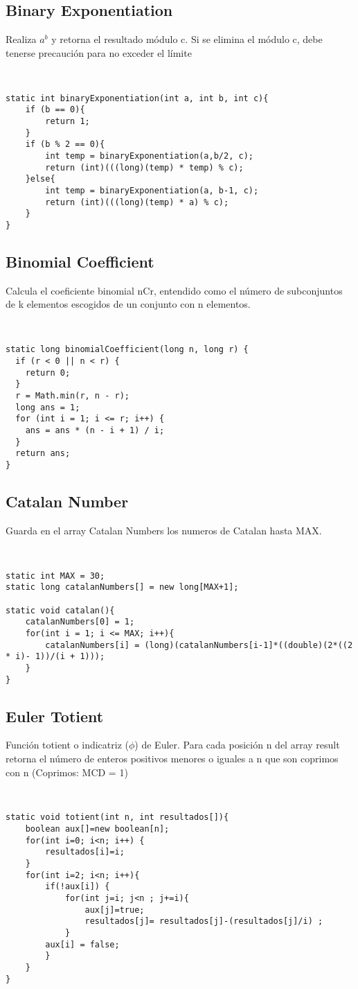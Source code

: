 \documentclass[11pt,letterpaper,twocolumn,twosided]{article}
\begin{document}
\subsection{Binary Exponentiation}
Realiza $a^{b}$ y retorna el resultado m\'odulo c. Si se elimina el m\'odulo c, debe tenerse precauci\'on para no exceder el l\'imite
\begin{lstlisting}


static int binaryExponentiation(int a, int b, int c){
    if (b == 0){
    	return 1;
    } 
    if (b % 2 == 0){
        int temp = binaryExponentiation(a,b/2, c);
        return (int)(((long)(temp) * temp) % c);
    }else{
        int temp = binaryExponentiation(a, b-1, c);
        return (int)(((long)(temp) * a) % c);
    }
}
\end{lstlisting}

\subsection{Binomial Coefficient}
Calcula el coeficiente binomial nCr, entendido como el n\'umero de subconjuntos  de k elementos escogidos de un conjunto con n elementos.
\begin{lstlisting}


static long binomialCoefficient(long n, long r) {
  if (r < 0 || n < r) { 
  	return 0; 
  }
  r = Math.min(r, n - r);
  long ans = 1;
  for (int i = 1; i <= r; i++) {
    ans = ans * (n - i + 1) / i;
  }
  return ans;
}
\end{lstlisting}

\subsection{Catalan Number}
Guarda en el array Catalan Numbers los numeros de Catalan hasta MAX.
\begin{lstlisting}


static int MAX = 30;
static long catalanNumbers[] = new long[MAX+1];

static void catalan(){
	catalanNumbers[0] = 1;
	for(int i = 1; i <= MAX; i++){
		catalanNumbers[i] = (long)(catalanNumbers[i-1]*((double)(2*((2 * i)- 1))/(i + 1)));
	}
}
\end{lstlisting}

\subsection{Euler Totient}
Funci\'on totient o indicatriz ($\phi$) de Euler. Para cada posici\'on n del array result retorna el n\'umero de enteros positivos menores o iguales a n que son coprimos con n (Coprimos: MCD = 1)
\begin{lstlisting}


static void totient(int n, int resultados[]){
	boolean aux[]=new boolean[n];
	for(int i=0; i<n; i++) {
		resultados[i]=i;
	}
	for(int i=2; i<n; i++){
		if(!aux[i]) {
			for(int j=i; j<n ; j+=i){
				aux[j]=true;
				resultados[j]= resultados[j]-(resultados[j]/i) ;
			}
		aux[i] = false;
		}
	}
}
\end{lstlisting}
\end{document}
